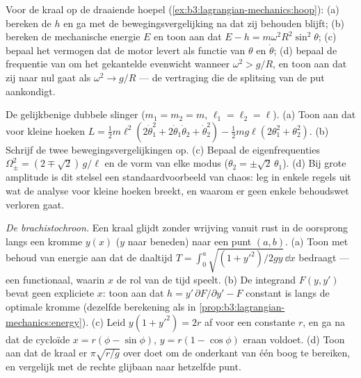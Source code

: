 \begin{exercise}[$\star\star$]\label{exo:b3:lagrangian-mechanics:9}
Voor de kraal op de draaiende hoepel
(\cref{ex:b3:lagrangian-mechanics:hoop}): (a) bereken de 
$h$ en ga met de bewegingsvergelijking na dat zij behouden blijft;
(b) bereken de mechanische energie $E$ en toon aan dat $E - h =
m\omega^2R^2\sin^2\theta$; (c) bepaal het vermogen dat de motor levert als
functie van $\theta$ en $\dot\theta$; (d) bepaal de frequentie van  om het gekantelde evenwicht wanneer $\omega^2 > g/R$, en toon
aan dat zij naar nul gaat als $\omega^2 \to g/R$ --- de vertraging die de
splitsing van de put aankondigt.
\end{exercise}

\begin{exercise}[$\star\star\star$]\label{exo:b3:lagrangian-mechanics:10}
De gelijkbenige dubbele slinger ($m_1 = m_2 = m$, $\ell_1 = \ell_2 = \ell$). (a) Toon aan dat voor kleine hoeken $L = \tfrac12 m\ell^2(2\dot\theta_1^2 +
2\dot\theta_1\dot\theta_2 + \dot\theta_2^2) - \tfrac12 mg\ell(2
\theta_1^2 + \theta_2^2)$. (b) Schrijf de twee
bewegingsvergelijkingen op. (c) Bepaal de eigenfrequenties $\Omega_\pm^2 = (2 \mp \sqrt2)\,g/\ell$ en de vorm van elke modus ($\theta_2 = \pm\sqrt2\,\theta_1$). (d) Bij grote amplitude is dit stelsel een
standaardvoorbeeld van chaos: leg in enkele regels uit wat de analyse voor
kleine hoeken breekt, en waarom er geen enkele behoudswet verloren gaat.
\end{exercise}

\begin{exercise}[$\star\star\star$]\label{exo:b3:lagrangian-mechanics:11}
\emph{De brachistochroon.} Een kraal glijdt zonder wrijving vanuit rust in
de oorsprong langs een kromme $y(x)$ ($y$ naar beneden) naar een punt $(a, b)$. (a) Toon met behoud van energie aan dat de daaltijd $T =
\int_0^a\sqrt{(1 + y'^2)/2gy}\,\dd x$ bedraagt --- een functionaal, waarin
$x$ de rol van de tijd speelt. (b) De integrand $F(y, y')$ bevat geen
expliciete $x$: toon aan dat $h = y'\,\partial F/\partial y' - F$ constant
is langs de optimale kromme (dezelfde berekening als in
\cref{prop:b3:lagrangian-mechanics:energy}). (c) Leid $y(1 + y'^2) =
2r$
af voor een constante $r$, en ga na dat de cycloïde $x = r(\phi -
\sin\phi)$, $y = r(1 - \cos\phi)$ eraan voldoet. (d) Toon aan dat de kraal
er $\pi\sqrt{r/g}$ over doet om de onderkant van één boog te bereiken, en
vergelijk met de rechte glijbaan naar hetzelfde punt.
\end{exercise}

